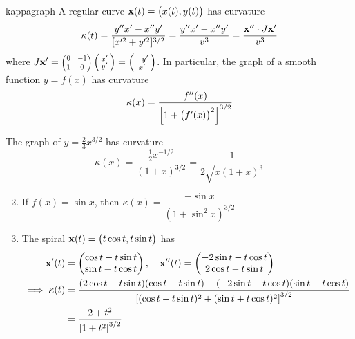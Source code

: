\begin{cor}{}{kappagraph}
	A regular curve ${\mathbf{x}}(t)=\bigl(x(t),y(t)\bigr)$ has curvature
	\[
		\kappa(t)=\frac{y''x'-x''y'}{[x'^2+y'^2]^{3/2}} =\frac{y''x'-x''y'}{v^3} =\frac{{\mathbf{x}}''\cdot J{\mathbf{x}}'}{v^3}
	\]
	where $J\vx'=\scalebox{0.75}{$\begin{pmatrix}
	0&-1\\1&0
	\end{pmatrix}$}\stwovec{x'}{y'}=\stwovec{-y'}{x'}$. In particular, the graph of a smooth function $y=f(x)$ has curvature
	\[
		\kappa(x)=\frac{f''(x)}{\Bigl[1+\bigl(f'(x)\bigr)^2\Bigr]^{3/2}}
	\]
\end{cor}


\begin{examples}{}{}
	\exstart The graph of $y=\frac 23x^{3/2}$ has curvature
	\[
		\kappa(x)=\frac{\frac 12x^{-1/2}}{(1+x)^{3/2}}= \frac 1{2\sqrt{x(1+x)^3}}
	\]
	\begin{enumerate}\setcounter{enumi}{1}
	  \item If $f(x)=\sin x$, then $\kappa(x)=\dfrac{-\sin x}{(1+\sin^2\!x)^{3/2}}$
	  \item The spiral ${\mathbf{x}}(t)=\bigl(t\cos t,t\sin t\bigr)$ has
	  \begin{align*}
		  {\mathbf{x}}'(t)&=\begin{pmatrix}\cos t-t\sin t\\\sin t+t\cos t\end{pmatrix},\quad {\mathbf{x}}''(t)=\begin{pmatrix}-2\sin t-t\cos t\\2\cos t-t\sin t\end{pmatrix}\\
		  \implies \kappa(t)&=\frac{(2\cos t-t\sin t)(\cos t-t\sin t)-(-2\sin t-t\cos t)(\sin t+t\cos t)}{\left[(\cos t-t\sin t)^2+(\sin t+t\cos t)^2\right]^{3/2}}\\
		  &=\frac{2+t^2}{\left[1+t^2\right]^{3/2}}
	  \end{align*}
\end{enumerate}
\end{examples}


\clearpage

